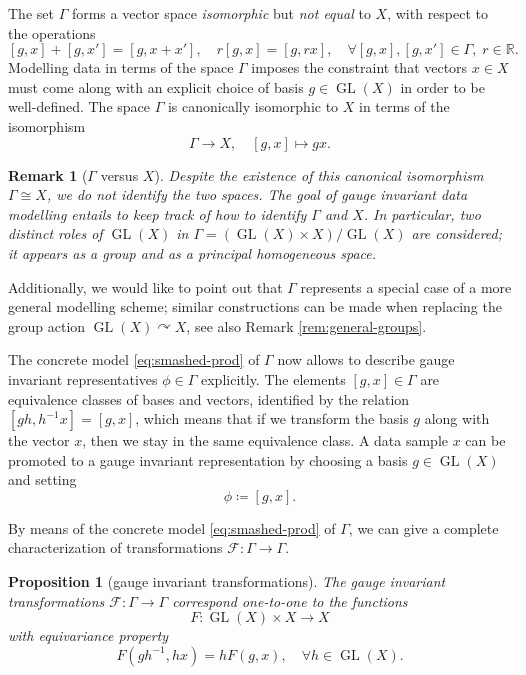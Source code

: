 \documentclass[10pt,reqno]{amsart}
\numberwithin{equation}{section}
\theoremstyle{bfnote}
\newtheorem{proposition}[theorem]{Proposition}
\theoremstyle{bfdef}
\newtheorem{remark}[theorem]{Remark}
\newcommand{\mc}[1]{\mathcal{#1}}
\newcommand{\R}{\mathbb{R}}
\DeclareMathOperator{\GL}{GL}
\providecommand\x; %
\renewcommand{\x}{x}
\providecommand\X; %
\renewcommand{\X}{X}
\providecommand\XX; %
\renewcommand{\XX}{\Gamma}
\begin{document}
	The set $\XX$ forms a vector space \textit{isomorphic} but \textit{not equal} to $\X$, with respect to the operations
	\begin{equation}\label{eq:Gamma-operations}
		[g,x] + [g,x'] = [g,x + x'], \quad
		r [g,x] = [g,rx], \quad \forall [g,x],[g,x'] \in \XX ,\; r \in \R.
	\end{equation}
	Modelling data in terms of the space $\Gamma$ imposes the constraint that vectors $\x \in \X$ must come along with an explicit choice of basis $g \in \GL(\X)$ in order to be well-defined. The space $\XX$ is canonically isomorphic to $X$ in terms of the isomorphism
	\begin{equation}
		\XX \to X, \quad [g,x] \mapsto gx. 
	\end{equation}
	\begin{remark}[$\XX$ versus $\X$]
		Despite the existence of this canonical isomorphism $\Gamma \cong \X$, we do not identify the two spaces. The goal of gauge invariant data modelling entails to keep track of \textit{how} to identify $\XX$ and $\X$. In particular, \textit{two distinct roles} of $\GL(X)$  in $\Gamma = (\GL(\X) \times X) / \GL(X)$ are considered; it appears as a group and as a \textit{principal homogeneous space}. 
	\end{remark}
	Additionally, we would like to point out that $\Gamma$ represents a special case of a more general modelling scheme; similar constructions can be made when replacing the group action $\GL(X) \curvearrowright X$, see also Remark \ref{rem:general-groups}. 

	The concrete model \eqref{eq:smashed-prod} of $\XX$ now allows to describe gauge invariant representatives $\phi \in \XX$ explicitly.
	The elements $[g,\x ] \in \XX$ are equivalence classes of bases and vectors, identified by the relation $[gh,h^{-1}\x ] = [g,\x ]$, which means that if we transform the basis $g$ along with the vector $\x$, then we stay in the same equivalence class.
	A data sample $\x$ can be promoted to a gauge invariant representation by choosing a basis $g \in \GL(X)$ and setting
	\begin{equation}
		\phi \coloneqq [g,\x].
	\end{equation}

	By means of the concrete model \eqref{eq:smashed-prod} of $\XX$, we can give a complete characterization of transformations $\mc{F} : \XX \to \XX$.
	\begin{proposition}[gauge invariant transformations]\label{prop:g-inv-trafos}
		The gauge invariant transformations $\mc{F} : \XX \to \XX$ correspond one-to-one to the functions
		\begin{equation}
			F : \GL(X) \times \X \to \X
		\end{equation}
		with equivariance property
		\begin{equation}\label{eq:consis}
			F(gh^{-1},hx) = h F(g,\x ), \quad \forall h \in \GL(\X).
		\end{equation}
	\end{proposition}
\end{document}
